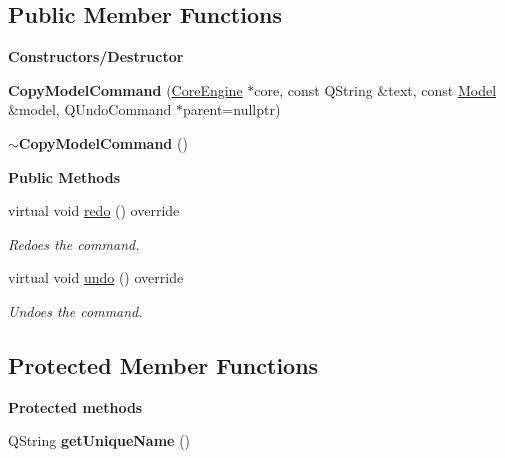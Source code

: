 \subsection*{Public Member Functions}
\begin{Indent}\textbf{ Constructors/\+Destructor}\par
\begin{DoxyCompactItemize}
\item 
\mbox{\label{classrev_1_1_copy_model_command_aff1664038abfdd08866aaa8ea0d350f5}} 
{\bfseries Copy\+Model\+Command} (\mbox{\hyperlink{classrev_1_1_core_engine}{Core\+Engine}} $\ast$core, const Q\+String \&text, const \mbox{\hyperlink{classrev_1_1_model}{Model}} \&model, Q\+Undo\+Command $\ast$parent=nullptr)
\item 
\mbox{\label{classrev_1_1_copy_model_command_a0a5a0208b99d6f57bbd9aa46c177687d}} 
{\bfseries $\sim$\+Copy\+Model\+Command} ()
\end{DoxyCompactItemize}
\end{Indent}
\begin{Indent}\textbf{ Public Methods}\par
\begin{DoxyCompactItemize}
\item 
\mbox{\label{classrev_1_1_copy_model_command_a31681da3044ba81af11eaaa95a3d4b50}} 
virtual void \mbox{\hyperlink{classrev_1_1_copy_model_command_a31681da3044ba81af11eaaa95a3d4b50}{redo}} () override
\begin{DoxyCompactList}\small\item\em Redoes the command. \end{DoxyCompactList}\item 
\mbox{\label{classrev_1_1_copy_model_command_a1739ebd55f1498e044a39695f3e4396f}} 
virtual void \mbox{\hyperlink{classrev_1_1_copy_model_command_a1739ebd55f1498e044a39695f3e4396f}{undo}} () override
\begin{DoxyCompactList}\small\item\em Undoes the command. \end{DoxyCompactList}\end{DoxyCompactItemize}
\end{Indent}
\subsection*{Protected Member Functions}
\begin{Indent}\textbf{ Protected methods}\par
\begin{DoxyCompactItemize}
\item 
\mbox{\label{classrev_1_1_copy_model_command_ae137241b0cbd3d6fbdae764fa4fbfc9f}} 
Q\+String {\bfseries get\+Unique\+Name} ()
\end{DoxyCompactItemize}
\end{Indent}
